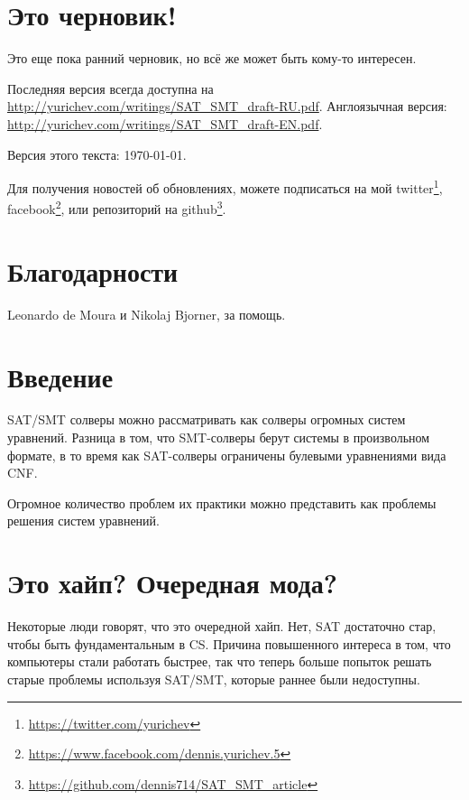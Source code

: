 \section{Это черновик!}

Это еще пока ранний черновик, но всё же может быть кому-то интересен.

Последняя версия всегда доступна на \url{http://yurichev.com/writings/SAT_SMT_draft-RU.pdf}.
Англоязычная версия: \url{http://yurichev.com/writings/SAT_SMT_draft-EN.pdf}.

Версия этого текста: \today{}.

Для получения новостей об обновлениях, можете подписаться на мой
twitter\footnote{\url{https://twitter.com/yurichev}}, 
facebook\footnote{\url{https://www.facebook.com/dennis.yurichev.5}}, 
или репозиторий на github\footnote{\url{https://github.com/dennis714/SAT_SMT_article}}.

\section{Благодарности}

Leonardo de Moura и Nikolaj Bjorner, за помощь.

\section{Введение}

\ac{SAT}/\ac{SMT} солверы можно рассматривать как солверы огромных систем уравнений.
Разница в том, что \ac{SMT}-солверы берут системы в произвольном формате,
в то время как \ac{SAT}-солверы ограничены булевыми уравнениями вида \ac{CNF}.

Огромное количество проблем их практики можно представить как проблемы решения систем уравнений.

\section{Это хайп? Очередная мода?}

Некоторые люди говорят, что это очередной хайп.
Нет, \ac{SAT} достаточно стар, чтобы быть фундаментальным в \ac{CS}.
Причина повышенного интереса в том, что компьютеры стали работать быстрее,
так что теперь больше попыток решать старые проблемы используя 
\ac{SAT}/\ac{SMT}, которые раннее были недоступны.

